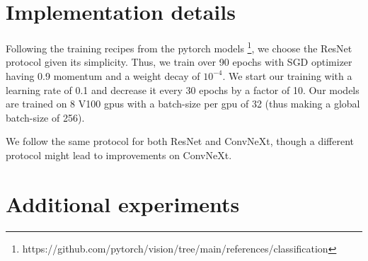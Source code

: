 
\section{Implementation details}
Following the training recipes from the pytorch models \footnote{https://github.com/pytorch/vision/tree/main/references/classification}, we choose the ResNet protocol given its simplicity. Thus, we train over 90 epochs with SGD optimizer having 0.9 momentum and a weight decay of $10^{-4}$. We start our training with a learning rate of 0.1 and decrease it every 30 epochs by a factor of 10. Our models are trained on 8 V100 gpus with a batch-size per gpu of 32 (thus making a global batch-size of 256).

We follow the same protocol for both ResNet and ConvNeXt, though a different protocol might lead to improvements on ConvNeXt.





\section{Additional experiments}
\label{sec:more-exp}





